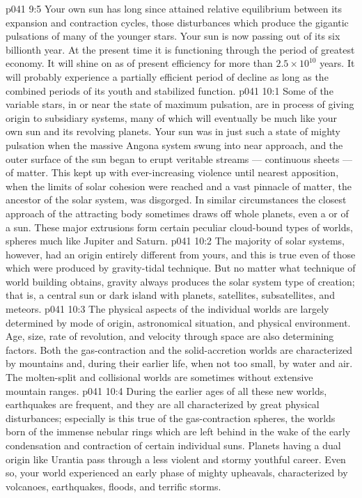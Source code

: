 \vs p041 9:5 Your own sun has long since attained relative equilibrium between its expansion and contraction cycles, those disturbances which produce the gigantic pulsations of many of the younger stars. Your sun is now passing out of its six billionth year. At the present time it is functioning through the period of greatest economy. It will shine on as of present efficiency for more than $2.5 \times 10^{10}$ years. It will probably experience a partially efficient period of decline as long as the combined periods of its youth and stabilized function.
\vs p041 10:1 Some of the variable stars, in or near the state of maximum pulsation, are in process of giving origin to subsidiary systems, many of which will eventually be much like your own sun and its revolving planets. Your sun was in just such a state of mighty pulsation when the massive Angona system swung into near approach, and the outer surface of the sun began to erupt veritable streams --- continuous sheets --- of matter. This kept up with ever\hyp{}increasing violence until nearest apposition, when the limits of solar cohesion were reached and a vast pinnacle of matter, the ancestor of the solar system, was disgorged. In similar circumstances the closest approach of the attracting body sometimes draws off whole planets, even a  or  of a sun. These major extrusions form certain peculiar cloud\hyp{}bound types of worlds, spheres much like Jupiter and Saturn.
\vs p041 10:2 The majority of solar systems, however, had an origin entirely different from yours, and this is true even of those which were produced by gravity\hyp{}tidal technique. But no matter what technique of world building obtains, gravity always produces the solar system type of creation; that is, a central sun or dark island with planets, satellites, subsatellites, and meteors.
\vs p041 10:3 \pc The physical aspects of the individual worlds are largely determined by mode of origin, astronomical situation, and physical environment. Age, size, rate of revolution, and velocity through space are also determining factors. Both the gas\hyp{}contraction and the solid\hyp{}accretion worlds are characterized by mountains and, during their earlier life, when not too small, by water and air. The molten\hyp{}split and collisional worlds are sometimes without extensive mountain ranges.
\vs p041 10:4 During the earlier ages of all these new worlds, earthquakes are frequent, and they are all characterized by great physical disturbances; especially is this true of the gas\hyp{}contraction spheres, the worlds born of the immense nebular rings which are left behind in the wake of the early condensation and contraction of certain individual suns. Planets having a dual origin like Urantia pass through a less violent and stormy youthful career. Even so, your world experienced an early phase of mighty upheavals, characterized by volcanoes, earthquakes, floods, and terrific storms.
